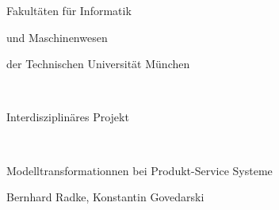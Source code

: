\frontmatter
\pagestyle{empty}

\begin{center}
\begin{Huge}
Fakult\"aten f\"ur Informatik 
\end{Huge}
\vspace{0.3in}
\begin{Huge}
und Maschinenwesen
\end{Huge}

\vspace{0.4in}
\begin{huge}
der Technischen Universit\"at M\"unchen
\end{huge}\\
\vspace{4cm}
\begin{LARGE}
Interdisziplin\"ares Projekt
\vspace{4cm}
\end{LARGE}\\


\begin{Huge}
Modelltransformationnen bei Produkt-Service Systeme
\vspace{3cm}

\end{Huge}
\begin{LARGE}
Bernhard Radke, Konstantin Govedarski \vspace{0.6in}
\end{LARGE}
%
%
\end{center}